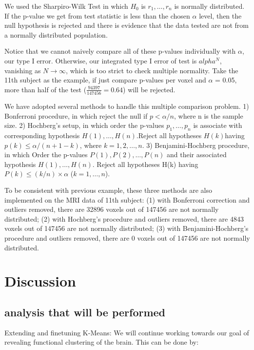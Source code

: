 \documentclass[11pt]{article}
\begin{document}
We used the Sharpiro-Wilk Test in which $H_0$ is $r_1,\dots ,r_n$ is normally
distributed. If the p-value we get from test statistic is less than the chosen
$\alpha$ level, then the null hypothesis is rejected and there is evidence that
the data tested are not from a normally distributed population.

Notice that we cannot naively compare all of these p-values individually with
$\alpha$, our type I error. Otherwise, our integrated type I error of test is
$alpha^N$, vanishing as $N \rightarrow \infty$, which is too strict to check
multiple normality. Take the 11th subject as the example, if just compare
p-values per voxel and $\alpha$ = 0.05, more than half of the test
($\frac{94397}{147456} =0.64$) will be rejected.

We have adopted several methods to handle this multiple comparison problem. 1)
Bonferroni procedure, in which reject the null if $p< \alpha/n$, where n is the
sample size. 2) Hochberg’s setup, in which order the p-values $p_1,\dots,p_n$ 
is
associate with corresponding hypothesis $H(1), \dots, H(n)$.Reject all
hypotheses $H(k) $having $p(k)\leq \alpha/(n+1-k)$, where $ k=1,2,\dots,n$. 3)
Benjamini-Hochberg procedure, in which Order the p-values 
$P(1),P(2),\dots,P(n)$
and their associated hypothesis $H(1),\dots,H(n)$. Reject all hypotheses H(k)
having $P(k) \leq (k/n)\times \alpha $ ($k=1,\dots ,n$).

To be consistent with previous example, these three methods are also 
implemented
on the MRI data of 11th subject: (1) with Bonferroni correction and outliers
removed, there are 32896 voxels out of 147456 are not normally distributed; (2)
with Hochberg's procedure and outliers removed, there are 4843 voxels out of
147456 are not normally distributed; (3) with Benjamini-Hochberg's procedure 
and
outliers removed, there are 0 voxels out of 147456 are not normally 
distributed.


\section{Discussion}

\subsection{analysis that will be performed}

Extending and finetuning K-Means: We will continue working towards our goal of
revealing functional clustering of the brain. This can be done by:
 
\end{document}
